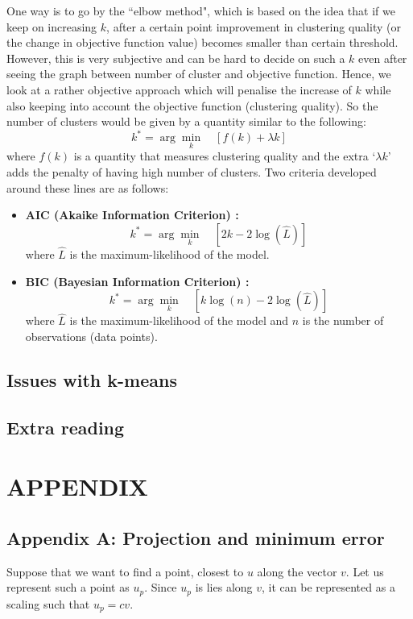 \documentclass[12pt,a4paper]{article}
\begin{document}
One way is to go by the ``elbow method", which is based on the idea that if we keep on increasing $k$, after a certain point improvement in clustering quality (or the change in objective function value) becomes smaller than certain threshold. However, this is very subjective and can be hard to decide on such a $k$ even after seeing the graph between number of cluster and objective function. Hence, we look at a rather objective approach which will penalise the increase of $k$ while also keeping into account the objective function (clustering quality). So the number of clusters would be given by a quantity similar to the following: $$k^* = \arg \min_k \quad [f(k) + \lambda k]$$ where $f(k)$ is a quantity that measures clustering quality and the extra `$\lambda k$' adds the penalty of having high number of clusters. Two criteria developed around these lines are as follows:
\begin{itemize}
    \item \textbf{AIC (Akaike Information Criterion) :} $$k^* = \arg \min_{k} \quad [2k - 2 \log{(\hat{L})}]$$ where $\hat{L}$ is the maximum-likelihood of the model.
    \item  \textbf{BIC (Bayesian Information Criterion) :} $$k^* = \arg \min_{k} \quad [k \log(n) - 2\log{(\hat{L})}]$$ where $\hat{L}$ is the maximum-likelihood of the model and $n$ is the number of observations (data points).
\end{itemize}


\subsection{Issues with k-means}

\subsection{Extra reading}

\newpage
\section{APPENDIX}
\subsection{Appendix A: Projection and minimum error}
Suppose that we want to find a point, closest to $u$ along the vector $v$. Let us represent such a point as $u_p$. Since $u_p$ is lies along $v$, it can be represented as a scaling such that $u_p= cv$. 
\end{document}
